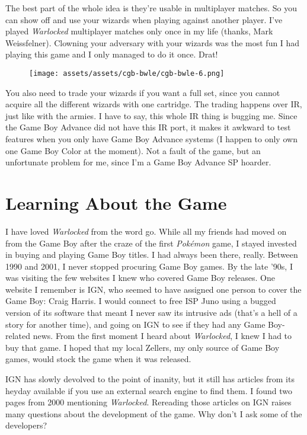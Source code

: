 \documentclass{book}
\begin{document}
The best part of the whole idea is they’re usable in multiplayer matches. So you can show off and use your wizards when playing against another player. I’ve played \emph{Warlocked} multiplayer matches only once in my life (thanks, Mark Weissfelner). Clowning your adversary with your wizards was the most fun I had playing this game and I only managed to do it once. Drat!

\begin{figure}[hbt]
\vskip 10pt
\centering \texttt{[image: assets/assets/cgb-bwle/cgb-bwle-6.png]}
\vskip 6pt
\end{figure}

You also need to trade your wizards if you want a full set, since you cannot acquire all the different wizards with one cartridge. The trading happens over IR, just like with the armies. I have to say, this whole IR thing is bugging me. Since the Game Boy Advance did not have this IR port, it makes it awkward to test features when you only have Game Boy Advance systems (I happen to only own one Game Boy Color at the moment). Not a fault of the game, but an unfortunate problem for me, since I’m a Game Boy Advance SP hoarder.

\FloatBarrier\needspace{5pt}\section*{Learning About the Game}\nopagebreak[4]

I have loved \emph{Warlocked} from the word go. While all my friends had moved on from the Game Boy after the craze of the first \emph{Pokémon} game, I stayed invested in buying and playing Game Boy titles. I had always been there, really. Between 1990 and 2001, I never stopped procuring Game Boy games. By the late ’90s, I was visiting the few websites I knew who covered Game Boy releases. One website I remember is IGN, who seemed to have assigned one person to cover the Game Boy: Craig Harris. I would connect to free ISP Juno using a bugged version of its software that meant I never saw its intrusive ads (that’s a hell of a story for another time), and going on IGN to see if they had any Game Boy-related news. From the first moment I heard about \emph{Warlocked}, I knew I had to buy that game. I hoped that my local Zellers, my only source of Game Boy games, would stock the game when it was released.

IGN has slowly devolved to the point of inanity, but it still has articles from its heyday available if you use an external search engine to find them. I found two pages from 2000 mentioning \emph{Warlocked}. Rereading those articles on IGN raises many questions about the development of the game. Why don’t I ask some of the developers?
\end{document}
